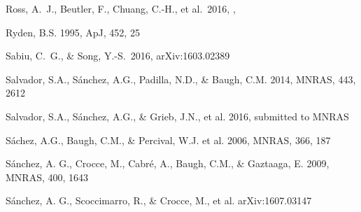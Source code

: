 \documentclass[iop]{emulateapj}
\begin{document}
\begin{thebibliography}{}



 Ross, A.~J., Beutler, F., Chuang, C.-H., et al.\ 2016, \mnras,  

Ryden, B.S. 1995, ApJ, 452, 25  



 Sabiu, C.~G., \& Song, Y.-S.\ 2016, arXiv:1603.02389 

Salvador, S.A., S\'{a}nchez, A.G., Padilla, N.D., \& Baugh, C.M. 2014, MNRAS, 443, 2612

Salvador, S.A., S\'{a}nchez, A.G., \& Grieb, J.N., et al. 2016, submitted to MNRAS

S\'{a}chez, A.G., Baugh, C.M., \& Percival, W.J. et al. 2006, MNRAS, 366, 187

S\'{a}nchez, A. G., Crocce, M., Cabr\'{e}, A., Baugh, C.M., \& Gaztaaga, E. 2009, MNRAS, 400, 1643

S\'{a}nchez, A. G., Scoccimarro, R., \& Crocce, M., et al.
arXiv:1607.03147







\end{thebibliography}
\end{document}
